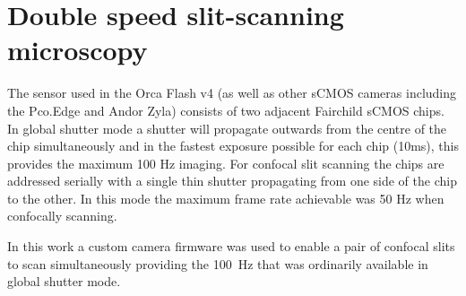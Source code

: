 



\section{Double speed slit-scanning microscopy}

The sensor used in the Orca Flash v4 (as well as other sCMOS cameras including the Pco.Edge and Andor Zyla) consists of two adjacent Fairchild sCMOS chips.
In global shutter mode a shutter will propagate outwards from the centre of the chip simultaneously and in the fastest exposure possible for each chip (10ms), this provides the maximum 100 Hz imaging.
For confocal slit scanning the chips are addressed serially with a single thin shutter propagating from one side of the chip to the other.
In this mode the maximum frame rate achievable was 50 Hz when confocally scanning.

In this work a custom camera firmware was used to enable a pair of confocal slits to scan simultaneously providing the \SI{100}{\hertz} that was ordinarily available in global shutter mode.


